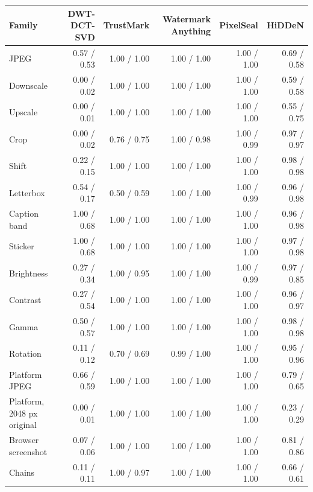 \begin{tabular}{lrrrrr}
\toprule
Family & DWT-DCT-SVD & TrustMark & Watermark Anything & PixelSeal & HiDDeN \\
\midrule
JPEG & 0.57 / 0.53 & 1.00 / 1.00 & 1.00 / 1.00 & 1.00 / 1.00 & 0.69 / 0.58 \\
Downscale & 0.00 / 0.02 & 1.00 / 1.00 & 1.00 / 1.00 & 1.00 / 1.00 & 0.59 / 0.58 \\
Upscale & 0.00 / 0.01 & 1.00 / 1.00 & 1.00 / 1.00 & 1.00 / 1.00 & 0.55 / 0.75 \\
Crop & 0.00 / 0.02 & 0.76 / 0.75 & 1.00 / 0.98 & 1.00 / 0.99 & 0.97 / 0.97 \\
Shift & 0.22 / 0.15 & 1.00 / 1.00 & 1.00 / 1.00 & 1.00 / 1.00 & 0.98 / 0.98 \\
Letterbox & 0.54 / 0.17 & 0.50 / 0.59 & 1.00 / 1.00 & 1.00 / 0.99 & 0.96 / 0.98 \\
Caption band & 1.00 / 0.68 & 1.00 / 1.00 & 1.00 / 1.00 & 1.00 / 1.00 & 0.96 / 0.98 \\
Sticker & 1.00 / 0.68 & 1.00 / 1.00 & 1.00 / 1.00 & 1.00 / 1.00 & 0.97 / 0.98 \\
Brightness & 0.27 / 0.34 & 1.00 / 0.95 & 1.00 / 1.00 & 1.00 / 0.99 & 0.97 / 0.85 \\
Contrast & 0.27 / 0.54 & 1.00 / 1.00 & 1.00 / 1.00 & 1.00 / 1.00 & 0.96 / 0.97 \\
Gamma & 0.50 / 0.57 & 1.00 / 1.00 & 1.00 / 1.00 & 1.00 / 1.00 & 0.98 / 0.98 \\
Rotation & 0.11 / 0.12 & 0.70 / 0.69 & 0.99 / 1.00 & 1.00 / 1.00 & 0.95 / 0.96 \\
Platform JPEG & 0.66 / 0.59 & 1.00 / 1.00 & 1.00 / 1.00 & 1.00 / 1.00 & 0.79 / 0.65 \\
Platform, 2048 px original & 0.00 / 0.01 & 1.00 / 1.00 & 1.00 / 1.00 & 1.00 / 1.00 & 0.23 / 0.29 \\
Browser screenshot & 0.07 / 0.06 & 1.00 / 1.00 & 1.00 / 1.00 & 1.00 / 1.00 & 0.81 / 0.86 \\
Chains & 0.11 / 0.11 & 1.00 / 0.97 & 1.00 / 1.00 & 1.00 / 1.00 & 0.66 / 0.61 \\
\bottomrule
\end{tabular}
